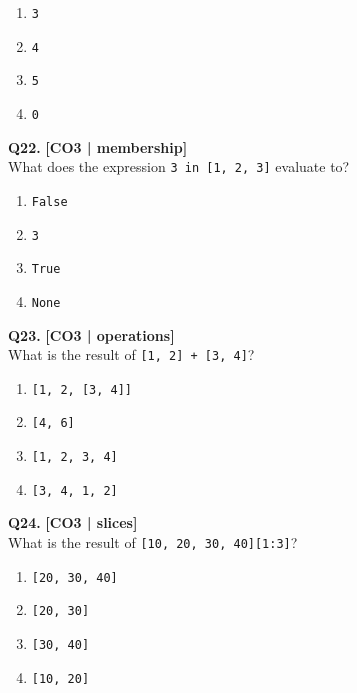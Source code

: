 \begin{enumerate}[label=(\alph*),topsep=2pt,itemsep=1pt,partopsep=0pt,parsep=0pt]
    \item \relax \texttt{3}
    \item \relax \texttt{4}
    \item \relax \texttt{5}
    \item \relax \texttt{0}
\end{enumerate}
\vspace{{2mm}}

\noindent\textbf{Q22.} \hfill {\small\color{LPUOrange}\textbf{[CO3 | membership]}}\\[2pt]
What does the expression \texttt{3 in [1, 2, 3]} evaluate to?

\begin{enumerate}[label=(\alph*),topsep=2pt,itemsep=1pt,partopsep=0pt,parsep=0pt]
    \item \relax \texttt{False}
    \item \relax \texttt{3}
    \item \relax \texttt{True}
    \item \relax \texttt{None}
\end{enumerate}
\vspace{{2mm}}

\noindent\textbf{Q23.} \hfill {\small\color{LPUOrange}\textbf{[CO3 | operations]}}\\[2pt]
What is the result of \texttt{[1, 2] + [3, 4]}?

\begin{enumerate}[label=(\alph*),topsep=2pt,itemsep=1pt,partopsep=0pt,parsep=0pt]
    \item \relax \texttt{[1, 2, [3, 4]]}
    \item \relax \texttt{[4, 6]}
    \item \relax \texttt{[1, 2, 3, 4]}
    \item \relax \texttt{[3, 4, 1, 2]}
\end{enumerate}
\vspace{{2mm}}

\noindent\textbf{Q24.} \hfill {\small\color{LPUOrange}\textbf{[CO3 | slices]}}\\[2pt]
What is the result of \texttt{[10, 20, 30, 40][1:3]}?

\begin{enumerate}[label=(\alph*),topsep=2pt,itemsep=1pt,partopsep=0pt,parsep=0pt]
    \item \relax \texttt{[20, 30, 40]}
    \item \relax \texttt{[20, 30]}
    \item \relax \texttt{[30, 40]}
    \item \relax \texttt{[10, 20]}
\end{enumerate}
\vspace{{2mm}}


